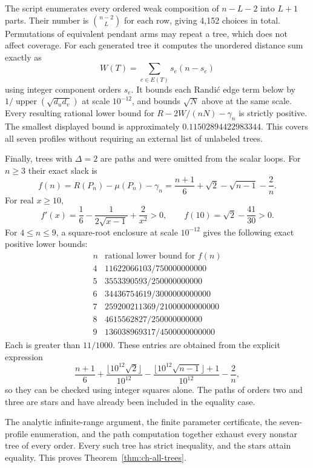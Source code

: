 \documentclass[11pt,a4paper]{article}
\theoremstyle{remark}
\numberwithin{equation}{section}
\begin{document}
The script enumerates every ordered weak composition of $n-L-2$ into
$L+1$ parts. Their number is $\binom{n-2}{L}$ for each row, giving 4,152
choices in total. Permutations of equivalent pendant arms may repeat a
tree, which does not affect coverage. For each generated tree it computes
the unordered distance sum exactly as
\[
                      W(T)=\sum_{e\in E(T)}s_e(n-s_e)
\]
using integer component orders $s_e$. It bounds each Randi\'c edge term
below by $1/\operatorname{upper}(\sqrt{d_ud_v})$ at scale $10^{-12}$,
and bounds $\sqrt N$ above at the same scale. Every resulting rational
lower bound for $R-2W/(nN)-\gamma_n$ is strictly positive. The smallest
displayed bound is approximately $0.11502894422983344$.
This covers all seven profiles without requiring an external list of
unlabeled trees.

Finally, trees with $\Delta=2$ are paths and were omitted from the scalar
loops. For $n\ge3$ their exact slack is
\[
 f(n)=R(P_n)-\mu(P_n)-\gamma_n
      =\frac{n+1}{6}+\sqrt2-\sqrt{n-1}-\frac2n.
\]
For real $x\ge10$,
\[
 f'(x)=\frac16-\frac1{2\sqrt{x-1}}+\frac2{x^2}>0,
 \qquad f(10)=\sqrt2-\frac{41}{30}>0.
\]
For $4\le n\le9$, a square-root enclosure at scale $10^{-12}$ gives
the following exact positive lower bounds:
\[
\begin{array}{c|c}
 n&\text{rational lower bound for }f(n)\\\hline
 4&11622066103/750000000000\\
 5&3553390593/250000000000\\
 6&34436754619/3000000000000\\
 7&259200211369/21000000000000\\
 8&4615562827/250000000000\\
 9&136038969317/4500000000000
\end{array}
\]
Each is greater than $11/1000$. These entries are obtained from the
explicit expression
\[
 \frac{n+1}{6}
 +\frac{\lfloor10^{12}\sqrt2\rfloor}{10^{12}}
 -\frac{\lfloor10^{12}\sqrt{n-1}\rfloor+1}{10^{12}}
 -\frac2n,
\]
so they can be checked using integer squares alone. The paths of orders
two and three are stars and have already been included in the equality
case.

The analytic infinite-range argument, the finite parameter certificate,
the seven-profile enumeration, and the path computation together exhaust
every nonstar tree of every order. Every such tree has strict inequality,
and the stars attain equality. This proves
Theorem~\ref{thm:ch-all-trees}.
\end{document}
